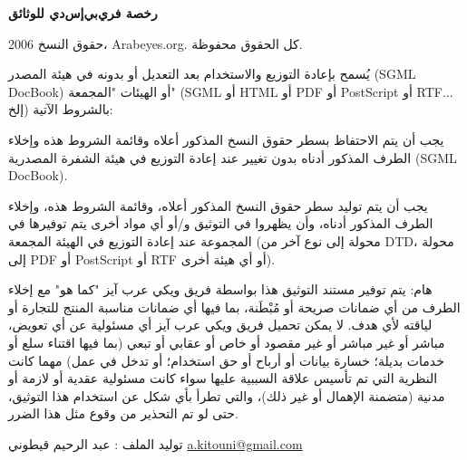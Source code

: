 \newpage
\begin{Arabic}
\begin{center}
\textbf{رخصة فري‌بي‌إس‌دي للوثائق}
\end{center}

حقوق النسخ 2006، \textenglish{Arabeyes.org}. كل الحقوق محفوظة.

يُسمح بإعادة التوزيع والاستخدام بعد التعديل أو بدونه في هيئة المصدر \textenglish{(SGML DocBook)} أو الهيئات "المجمعة" (\textenglish{SGML} أو \textenglish{HTML} أو \textenglish{PDF} أو \textenglish{PostScript} أو \textenglish{RTF}... إلخ) بالشروط الآتية:

يجب أن يتم الاحتفاظ بسطر حقوق النسخ المذكور أعلاه وقائمة الشروط هذه وإخلاء الطرف المذكور أدناه بدون تغيير عند إعادة التوزيع في هيئة الشفرة المصدرية \textenglish{(SGML DocBook)}.

يجب أن يتم توليد سطر حقوق النسخ المذكور أعلاه، وقائمة الشروط هذه، وإخلاء الطرف المذكور أدناه، وأن يظهروا في التوثيق و/أو أي مواد أخرى يتم توفيرها في المجموعة عند إعادة التوزيع في الهيئة المجمعة (محولة إلى نوع آخر من \textenglish{DTD}، محولة إلى \textenglish{PDF} أو \textenglish{PostScript} أو \textenglish{RTF} أو أي هيئة أخرى).

هام: يتم توفير مستند التوثيق هذا بواسطة فريق ويكي عرب آيز "كما هو" مع إخلاء الطرف من أي ضمانات صريحة أو مُبْطَنة، بما فيها أي ضمانات مناسبة المنتج للتجارة أو لياقته لأي هدف. لا يمكن تحميل فريق ويكي عرب آيز أي مسئولية عن أي تعويض، مباشر أو غير مباشر أو غير مقصود أو خاص أو عقابي أو تبعي (بما فيها اقتناء سلع أو خدمات بديلة؛ خسارة بيانات أو أرباح أو حق استخدام؛ أو تدخل في عمل) مهما كانت النظرية التي تم تأسيس علاقة السببية عليها سواء كانت مسئولية عقدية أو لازمة أو مدنية (متضمنة الإهمال أو غير ذلك)، والتي تطرأ بأي شكل عن استخدام هذا التوثيق، حتى لو تم التحذير من وقوع مثل هذا الضرر.
\vspace{1cm}

توليد الملف : عبد الرحيم قيطوني \url{a.kitouni@gmail.com}
\end{Arabic}


